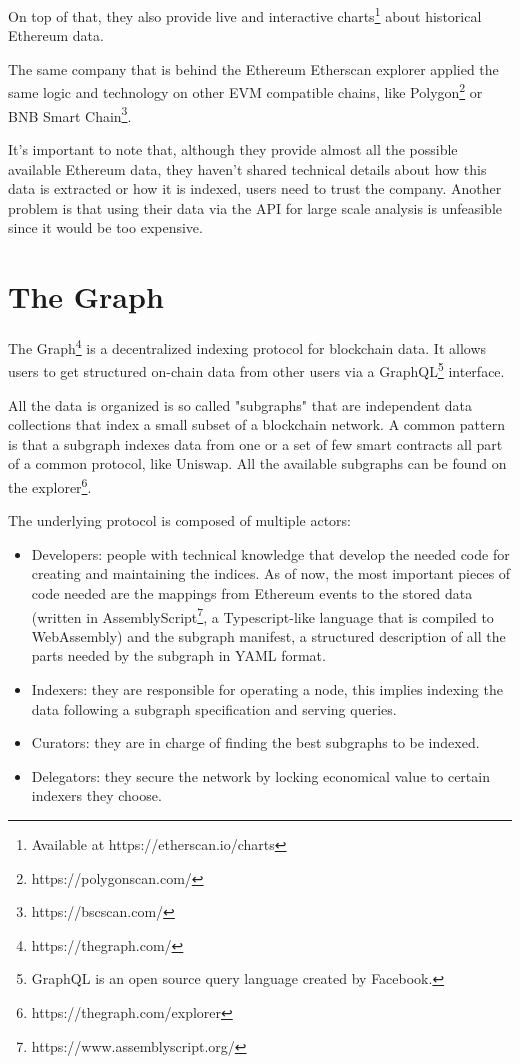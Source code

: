 On top of that, they also provide live and interactive charts\footnote{Available at https://etherscan.io/charts} about historical Ethereum data.

The same company that is behind the Ethereum Etherscan explorer applied the same logic and technology on other EVM compatible chains, like Polygon\footnote{https://polygonscan.com/} or BNB Smart Chain\footnote{https://bscscan.com/}.

It's important to note that, although they provide almost all the possible available Ethereum data, they haven't shared technical details about how this data is extracted or how it is indexed, users need to trust the company. Another problem is that using their data via the API for large scale analysis is unfeasible since it would be too expensive.


\section{The Graph}

The Graph\footnote{https://thegraph.com/} is a decentralized indexing protocol for blockchain data. It allows users to get structured on-chain data from other users via a GraphQL\footnote{GraphQL is an open source query language created by Facebook.} interface. 

All the data is organized is so called "subgraphs" that are independent data collections that index a small subset of a blockchain network. A common pattern is that a subgraph indexes data from one or a set of few smart contracts all part of a common protocol, like Uniswap. All the available subgraphs can be found on the explorer\footnote{https://thegraph.com/explorer}.

The underlying protocol is composed of multiple actors:

\begin{itemize}
  \item Developers: people with technical knowledge that develop the needed code for creating and maintaining the indices. As of now, the most important pieces of code needed are the mappings from Ethereum events to the stored data (written in AssemblyScript\footnote{https://www.assemblyscript.org/}, a Typescript-like language that is compiled to WebAssembly) and the subgraph manifest, a structured description of all the parts needed by the subgraph in YAML format.  
  \item Indexers: they are responsible for operating a node, this implies indexing the data following a subgraph specification and serving queries.
  \item Curators: they are in charge of finding the best subgraphs to be indexed.
  \item Delegators: they secure the network by locking economical value to certain indexers they choose.
\end{itemize}

